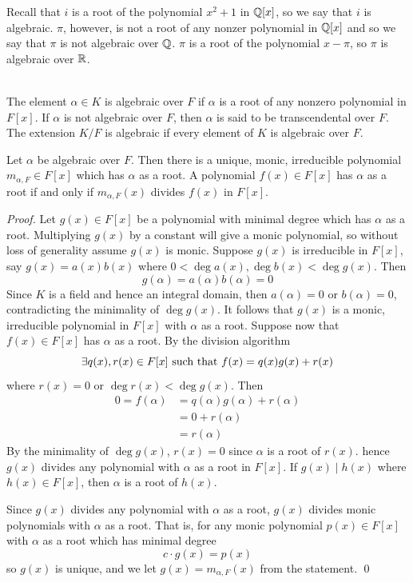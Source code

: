 Recall that $i$ is a root of the polynomial $x^2+1$ in $\mathbb{Q}[x]$, so we say that $i$ is algebraic. $\pi$, however, is not a root of any nonzer polynomial in $\mathbb{Q}[x]$ and so we say that $\pi$ is not algebraic over $\mathbb{Q}$. $\pi$ is a root of the polynomial $x - \pi$, so $\pi$ is algebraic over $\mathbb{R}$.

\begin{definition} \leavevmode \\
    The element $\alpha \in K$ is algebraic over $F$ if $\alpha$ is a root of any nonzero polynomial in $F[x]$. If $\alpha$ is not algebraic over $F$, then $\alpha$ is said to be transcendental over $F$. The extension $K/F$ is algebraic if every element of $K$ is algebraic over $F$.
\end{definition}

\begin{proposition}
    Let $\alpha$ be algebraic over $F$. Then there is a unique, monic, irreducible polynomial $m_{\alpha, F} \in F[x]$ which has $\alpha$ as a root. A polynomial $f(x) \in F[x]$ has $\alpha$ as a root if and only if $m_{\alpha, F}(x)$ divides $f(x)$ in $F[x]$.
\end{proposition}

\begin{proof}
    Let $g(x) \in F[x]$ be a polynomial with minimal degree which has $\alpha$ as a root. Multiplying $g(x)$ by a constant will give a monic polynomial, so without loss of generality assume $g(x)$ is monic. Suppose $g(x)$ is irreducible in $F[x]$, say $g(x) = a(x)b(x)$ where $0 < \deg a(x), \deg b(x) < \deg g(x)$. Then
    $$g(\alpha) = a(\alpha)b(\alpha) = 0$$
    Since $K$ is a field and hence an integral domain, then $a(\alpha) = 0$ or $b(\alpha) = 0$, contradicting the minimality of $\deg g(x)$. It follows that $g(x)$ is a monic, irreducible polynomial in $F[x]$ with $\alpha$ as a root. Suppose now that $f(x) \in F[x]$ has $\alpha$ as a root. By the division algorithm 
    $$\exists q(x), r(x) \in F[x] \text{ such that } f(x) = q(x)g(x) + r(x)$$
    where $r(x) = 0$ or $\deg r(x) < \deg g(x)$. Then
    \begin{align*}
        0 = f(\alpha) &= q(\alpha)g(\alpha) + r(\alpha) \\
        &= 0 + r(\alpha) \\
        &= r(\alpha)
    \end{align*}
    By the minimality of $\deg g(x)$, $r(x) = 0$ since $\alpha$ is a root of $r(x)$. hence $g(x)$ divides any polynomial with $\alpha$ as a root in $F[x]$. If $g(x) \mid h(x)$ where $h(x) \in F[x]$, then $\alpha$ is a root of $h(x)$.

    Since $g(x)$ divides any polynomial with $\alpha$ as a root, $g(x)$ divides monic polynomials with $\alpha$ as a root. That is, for any monic polynomial $p(x) \in F[x]$ with $\alpha$ as a root which has minimal degree
    $$c \cdot g(x) = p(x)$$
    so $g(x)$ is unique, and we let $g(x) = m_{\alpha, F}(x)$ from the statement.
    \qed
\end{proof}

